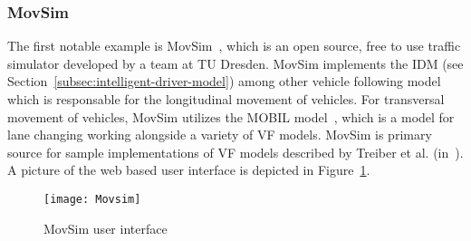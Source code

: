             \subsubsection{MovSim}
                The first notable example is MovSim~\cite{Treiber2010}, which is an open source, free to use traffic simulator developed by a team at TU Dresden.
                MovSim implements the IDM (see Section~\ref{subsec:intelligent-driver-model}) among other vehicle following model which is responsable for the longitudinal movement of vehicles.
                For transversal movement of vehicles, MovSim utilizes the MOBIL model~\cite{kesting2007general}, which is a model for lane changing working alongside a variety of VF models.
                MovSim is primary source for sample implementations of VF models described by Treiber et al. (in~\cite{treiber2013traffic}).
                A picture of the web based user interface is depicted in Figure~\ref{fig:mov-sim-ui}.

                \begin{figure}[H]
                    \centering
                    \texttt{[image: Movsim]}
                    \caption{MovSim user interface~\cite{MovSimUI}}
                    \label{fig:mov-sim-ui}
                \end{figure}
